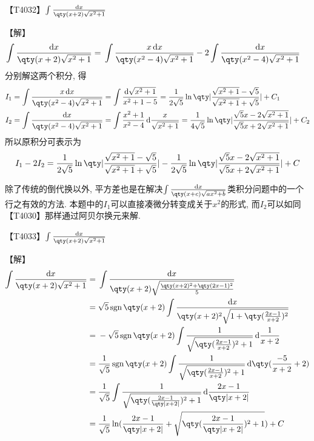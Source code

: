 \documentclass{ctexbook}
\DeclareMathOperator{\sgn}{sgn}
\newcommand*{\dif}{\mathop{}\!\mathrm{d}}
\begin{document}
{【T4032】$\int\frac{\dif{x}}{\qty(x+2)\sqrt{x^{2}+1}}$\par
【解】
\begin{align*}
\int\frac{\dif{x}}{\qty(x+2)\sqrt{x^{2}+1}}={}&\int\frac{x\dif{x}}{\qty(x^{2}-4)\sqrt{x^{2}+1}}-2\int\frac{\dif{x}}{\qty(x^{2}-4)\sqrt{x^{2}+1}}
\end{align*}
分别解这两个积分, 得
\begin{align*}
{}&I_{1}=\int\frac{x\dif{x}}{\qty(x^{2}-4)\sqrt{x^{2}+1}}=\int\frac{\dif{\sqrt{x^{2}+1}}}{x^{2}+1-5}=\frac{1}{2\sqrt{5}}\ln\qty|\frac{\sqrt{x^{2}+1}-\sqrt{5}}{\sqrt{x^{2}+1}+\sqrt{5}}|+C_{1}\\
{}&I_{2}=\int\frac{\dif{x}}{\qty(x^{2}-4)\sqrt{x^{2}+1}}=\int\frac{x^{2}+1}{x^{2}-4}\dif{\frac{x}{\sqrt{x^{2}+1}}}=\frac{1}{4\sqrt{5}}\ln\qty|\frac{\sqrt{5}x-2\sqrt{x^{2}+1}}{\sqrt{5}x+2\sqrt{x^{2}+1}}|+C_{2}
\end{align*}
所以原积分可表示为
\begin{align*}
I_{1}-2I_{2}=\frac{1}{2\sqrt{5}}\ln\qty|\frac{\sqrt{x^{2}+1}-\sqrt{5}}{\sqrt{x^{2}+1}+\sqrt{5}}|-\frac{1}{2\sqrt{5}}\ln\qty|\frac{\sqrt{5}x-2\sqrt{x^{2}+1}}{\sqrt{5}x+2\sqrt{x^{2}+1}}|+C
\end{align*}\par
{\kaishu 除了传统的倒代换以外, 平方差也是在解决$\int\frac{\dif{x}}{\qty(x+c)\sqrt{ax^{2}+b}}$类积分问题中的一个行之有效的方法. 本题中的$I_{1}$可以直接凑微分转变成关于$x^{2}$的形式, 而$I_{2}$可以如同【T4030】那样通过阿贝尔换元来解. \par}
【T4033】$\int\frac{\dif{x}}{\qty(x+2)\sqrt{x^{2}+1}}$\par
【解】
\begin{align*}
\int\frac{\dif{x}}{\qty(x+2)\sqrt{x^{2}+1}}={}&\int\frac{\dif{x}}{\qty(x+2)\sqrt{\frac{\qty(x+2)^{2}+\qty(2x-1)^{2}}{5}}}\\
={}&\sqrt{5}\sgn{\qty(x+2)}\int\frac{\dif{x}}{\qty(x+2)^{2}\sqrt{1+\qty(\frac{2x-1}{x+2})^{2}}}\\
={}&-\sqrt{5}\sgn{\qty(x+2)}\int\frac{1}{\sqrt{\qty(\frac{2x-1}{x+2})^{2}+1}}\dif{\frac{1}{x+2}}\\
={}&\frac{1}{\sqrt{5}}\sgn{\qty(x+2)}\int\frac{1}{\sqrt{\qty(\frac{2x-1}{x+2})^{2}+1}}\dif{\qty(\frac{-5}{x+2}+2)}\\
={}&\frac{1}{\sqrt{5}}\int\frac{1}{\sqrt{\qty(\frac{2x-1}{\qty|x+2|})^{2}+1}}\dif{\frac{2x-1}{\qty|x+2|}}\\
={}&\frac{1}{\sqrt{5}}\ln(\frac{2x-1}{\qty|x+2|}+\sqrt{\qty(\frac{2x-1}{\qty|x+2|})^{2}+1})+C\\

\end{align*}}
\end{document}
